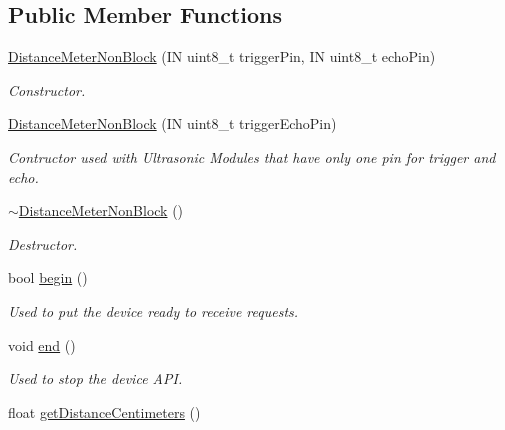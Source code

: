 \subsection*{Public Member Functions}
\begin{DoxyCompactItemize}
\item 
\hyperlink{class_easyuino_1_1_distance_meter_non_block_ad7e7b63fc4655957eb00f24d82512d2a}{Distance\+Meter\+Non\+Block} (IN uint8\+\_\+t trigger\+Pin, IN uint8\+\_\+t echo\+Pin)
\begin{DoxyCompactList}\small\item\em Constructor. \end{DoxyCompactList}\item 
\hyperlink{class_easyuino_1_1_distance_meter_non_block_af77c0f4649ea521a5b75c457b6762db2}{Distance\+Meter\+Non\+Block} (IN uint8\+\_\+t trigger\+Echo\+Pin)
\begin{DoxyCompactList}\small\item\em Contructor used with Ultrasonic Modules that have only one pin for trigger and echo. \end{DoxyCompactList}\item 
\mbox{\label{class_easyuino_1_1_distance_meter_non_block_aabd746582e5f4dbca115e6459249e002}} 
\hyperlink{class_easyuino_1_1_distance_meter_non_block_aabd746582e5f4dbca115e6459249e002}{$\sim$\+Distance\+Meter\+Non\+Block} ()
\begin{DoxyCompactList}\small\item\em Destructor. \end{DoxyCompactList}\item 
bool \hyperlink{class_easyuino_1_1_distance_meter_non_block_a46d2093d0fc125e98c3602868c088a77}{begin} ()
\begin{DoxyCompactList}\small\item\em Used to put the device ready to receive requests. \end{DoxyCompactList}\item 
void \hyperlink{class_easyuino_1_1_distance_meter_non_block_a845d4db657ff408205d1cdb3c35982a4}{end} ()
\begin{DoxyCompactList}\small\item\em Used to stop the device A\+PI. \end{DoxyCompactList}\item 
float \hyperlink{class_easyuino_1_1_distance_meter_non_block_a00419fc2c2ff7c587735063971aa7464}{get\+Distance\+Centimeters} ()

\end{DoxyCompactItemize}

